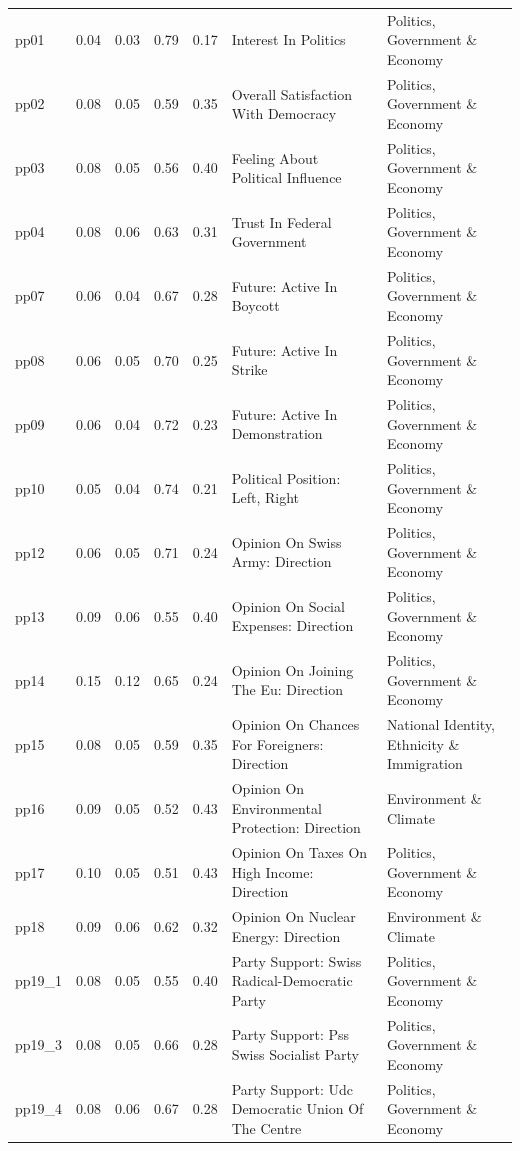 \documentclass[
  12pt,
]{article}
\begin{document}
\begin{landscape}
\begin{scriptsize}
\begin{longtable}{|p{1.75in}|p{0.3in}|p{0.3in}|p{0.3in}|p{0.3in}|p{2.5in}|p{2.5in}}
pp01 & 0.04 & 0.03 & 0.79 & 0.17 & Interest In Politics & Politics, Government \& Economy \\ 
pp02 & 0.08 & 0.05 & 0.59 & 0.35 & Overall Satisfaction With Democracy & Politics, Government \& Economy \\ 
pp03 & 0.08 & 0.05 & 0.56 & 0.40 & Feeling About Political Influence & Politics, Government \& Economy \\ 
pp04 & 0.08 & 0.06 & 0.63 & 0.31 & Trust In Federal Government & Politics, Government \& Economy \\ 
pp07 & 0.06 & 0.04 & 0.67 & 0.28 & Future: Active In Boycott & Politics, Government \& Economy \\ 
pp08 & 0.06 & 0.05 & 0.70 & 0.25 & Future: Active In Strike & Politics, Government \& Economy \\ 
pp09 & 0.06 & 0.04 & 0.72 & 0.23 & Future: Active In Demonstration & Politics, Government \& Economy \\ 
pp10 & 0.05 & 0.04 & 0.74 & 0.21 & Political Position: Left, Right & Politics, Government \& Economy \\ 
pp12 & 0.06 & 0.05 & 0.71 & 0.24 & Opinion On Swiss Army: Direction & Politics, Government \& Economy \\ 
pp13 & 0.09 & 0.06 & 0.55 & 0.40 & Opinion On Social Expenses: Direction & Politics, Government \& Economy \\ 
pp14 & 0.15 & 0.12 & 0.65 & 0.24 & Opinion On Joining The Eu: Direction & Politics, Government \& Economy \\ 
pp15 & 0.08 & 0.05 & 0.59 & 0.35 & Opinion On Chances For Foreigners: Direction & National Identity, Ethnicity \& Immigration \\ 
pp16 & 0.09 & 0.05 & 0.52 & 0.43 & Opinion On Environmental Protection: Direction & Environment \& Climate \\ 
pp17 & 0.10 & 0.05 & 0.51 & 0.43 & Opinion On Taxes On High Income: Direction & Politics, Government \& Economy \\ 
pp18 & 0.09 & 0.06 & 0.62 & 0.32 & Opinion On Nuclear Energy: Direction & Environment \& Climate \\ 
pp19\_1 & 0.08 & 0.05 & 0.55 & 0.40 & Party Support: Swiss Radical-Democratic Party & Politics, Government \& Economy \\ 
pp19\_3 & 0.08 & 0.05 & 0.66 & 0.28 & Party Support: Pss Swiss Socialist Party & Politics, Government \& Economy \\ 
pp19\_4 & 0.08 & 0.06 & 0.67 & 0.28 & Party Support: Udc Democratic Union Of The Centre & Politics, Government \& Economy \\ 

\end{longtable}
\end{scriptsize}
\end{landscape}
\end{document}
